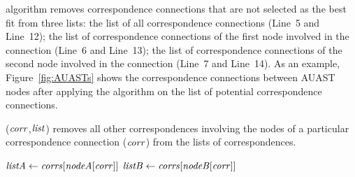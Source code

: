 algorithm removes correspondence connections that are not selected as the best fit from three lists: the list of all correspondence connections (Line~5 and Line~12);
the list of correspondence connections of the first node involved in the connection (Line~6 and Line~13); the list of correspondence connections of the second node involved in the connection (Line~7 and Line~14). As an example, Figure~\ref{fig:AUASTs} shows the correspondence connections between AUAST nodes after applying the  algorithm on the list of potential correspondence connections.

\begin{algorithm}
\caption{($\mathit{corr}$,$\mathit{list}$) removes all other correspondences involving the nodes of a particular correspondence connection ($\mathit{corr}$) from the lists of correspondences.}
\label{removeOtherCEs}
  \begin{algorithmic}[1]
  \RemoveOtherCEs
       \State $\mathit{listA} \gets \mathit{corrs}[\mathit{nodeA}[\mathit{corr}]]$
	   \State $\mathit{listB} \gets \mathit{corrs}[\mathit{nodeB}[\mathit{corr}]]$
	   		 \EndIf
	   \EndFor		
	 	 	 		 
	   		 \EndIf
	   \EndFor	  	
  \end{algorithmic}
\end{algorithm}




